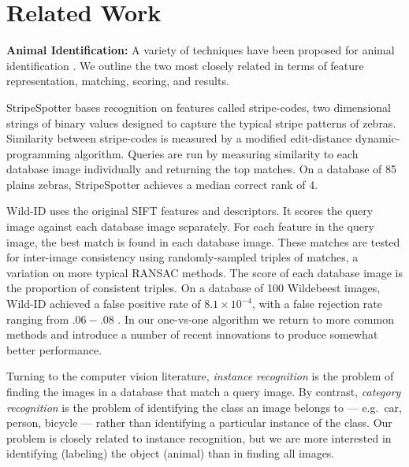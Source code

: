 \newcommand{\plusequals}{\hspace*{1mm}+\hspace*{-1mm}=}

\section {Related Work}

\textbf{Animal Identification:}
A variety of techniques have been proposed for animal identification \cite{si04BradfieldFrogPhoto, aje09ShorrocksNeckNet, fiz07SpeedSpotMatch}.
We outline the two most closely related in terms of feature
representation, matching, scoring, and results.

StripeSpotter \cite{icmr11LahiriStripeSpotter} bases recognition on features
called stripe-codes, two dimensional strings of binary values
designed to capture the typical stripe patterns of zebras.
Similarity between stripe-codes is measured by a
modified edit-distance dynamic-programming algorithm.  Queries are run
by measuring similarity to each database image individually and
returning the top matches.  On a database of 85 plains %
zebras, StripeSpotter achieves a median correct rank of 4.

Wild-ID \cite{11BoldgerWILDID} uses the original SIFT
\cite{ijcv04LoweSIFT} features and descriptors. It scores the query
image against each database image separately. For each feature in
the query image, the best match is found in each database image. These
matches are tested for inter-image consistency using randomly-sampled
triples of matches, a variation on more typical RANSAC methods.  The
score of each database image is the proportion of consistent triples.
On a database of 100 Wildebeest images, Wild-ID achieved a
false positive rate of $8.1 \times 10^{-4}$, with a false rejection
rate ranging from $.06-.08$ \cite{joae12MorrisonWetSeason}.  In our
one-vs-one algorithm we return to more common methods and introduce a
number of recent innovations to produce somewhat better performance.

Turning to the computer vision literature, \emph{instance recognition}
is the problem of finding the images in a database that match a query
image.  By contrast, \emph{category recognition} is the problem of
identifying the class an image belongs to --- e.g.\ car, person,
bicycle --- rather than identifying a particular instance of the
class. Our problem is closely related to instance recognition,
but we are more interested in identifying (labeling) the
object (animal) than in finding all images.

